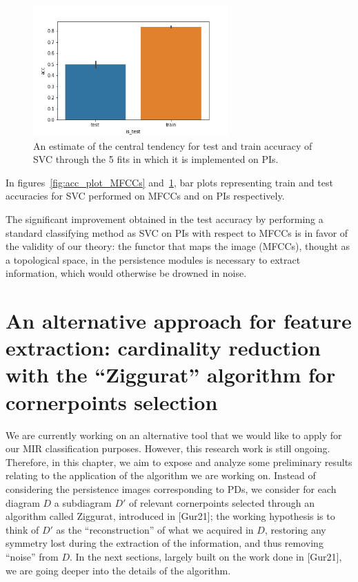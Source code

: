 \documentclass[english, LaM, oneside, noexaminfo]{sapthesis}
\begin{document}
\begin{figure}[tb]
\centering
\includegraphics[height=5cm]{PIs_accuracy_barplot.png}
\caption{An estimate of the central tendency for test and train accuracy of SVC through the 5 fits in which it is implemented on PIs.}\label{fig:acc_plot_PIs}
\end{figure}

In figures~\ref{fig:acc_plot_MFCCs} and~\ref{fig:acc_plot_PIs}, bar plots representing train and test accuracies for SVC performed on MFCCs and on PIs respectively. 

The significant improvement obtained in the test accuracy by performing a standard classifying method as SVC on PIs with respect to MFCCs is in favor of the validity of our theory: the functor that maps the image (MFCCs), thought as a topological space, in the persistence modules is necessary to extract information, which would otherwise be drowned in noise.

\chapter{An alternative approach for feature extraction: cardinality reduction with the ``Ziggurat'' algorithm for cornerpoints selection}

We are currently working on an alternative tool that we would like to apply for our MIR classification purposes. However, this research work is still ongoing. Therefore, in this chapter, we aim to expose and analyze some preliminary results relating to the application of the algorithm we are working on.
Instead of considering the persistence images corresponding to PDs, we consider for each diagram $D$ a subdiagram $D'$ of relevant cornerpoints selected through an algorithm called Ziggurat, introduced in [Gur21]; the working hypothesis is to think of $D'$ as the ``reconstruction'' of what we acquired in $D$, restoring any symmetry lost during the extraction of the information, and thus removing ``noise'' from $D$. In the next sections, largely built on the work done in [Gur21], we are going deeper into the details of the algorithm.
\end{document}
